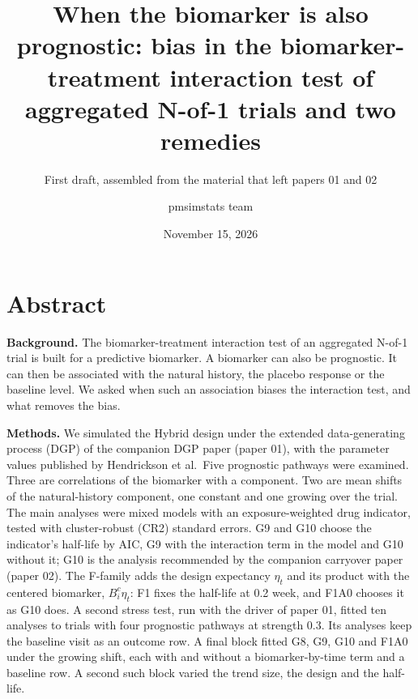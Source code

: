 \documentclass[
  11pt,
]{article}
\title{When the biomarker is also prognostic: bias in the biomarker-treatment interaction test of aggregated N-of-1 trials and two remedies}
\subtitle{First draft, assembled from the material that left papers 01 and 02}
\author{pmsimstats team}
\date{November 15, 2026}
\begin{document}
\maketitle

{
\setcounter{tocdepth}{2}
\tableofcontents
}
\listoftables
{}
\section*{Abstract}\label{abstract}

\textbf{Background.} The biomarker-treatment interaction test of an
aggregated N-of-1 trial is built for a predictive biomarker. A
biomarker can also be prognostic. It can then be associated with the
natural history, the placebo response or the baseline level. We asked
when such an association biases the interaction test, and what
removes the bias.

\textbf{Methods.} We simulated the Hybrid design under the extended
data-generating process (DGP) of the companion DGP paper (paper 01), with the
parameter values published by Hendrickson et al.~Five prognostic
pathways were examined. Three are correlations of the biomarker with a
component. Two are mean shifts of the natural-history component, one
constant and one growing over the trial. The main analyses were mixed
models with an exposure-weighted drug indicator, tested with
cluster-robust (CR2) standard errors. G9 and G10 choose the
indicator's half-life by AIC, G9 with the interaction term in the
model and G10 without it; G10 is the analysis recommended by the
companion carryover paper (paper 02). The F-family adds the design
expectancy \(\eta_t\) and its product with the centered biomarker,
\(B^c_i\eta_t\): F1 fixes the half-life at 0.2 week, and F1A0 chooses
it as G10 does.
A second stress test, run with the driver of paper 01,
fitted ten analyses to trials with four prognostic pathways at
strength 0.3. Its analyses keep the baseline visit as an outcome row.
A final block fitted G8, G9, G10 and F1A0 under the growing shift,
each with and without a biomarker-by-time term and a baseline row.
A second such block varied the trend size, the design and the
half-life.
\end{document}
